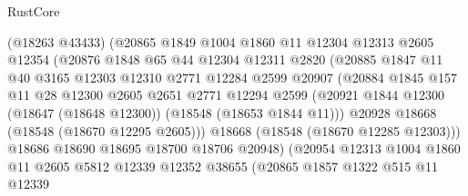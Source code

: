 \begin{lexlean}{RustCore}
\begin{coremodule}
                        (@18263 @43433)
                        (@20865
                          @1849
                          @1004
                          @1860
                          @11
                          @12304
                          @12313
                          @2605
                          @12354
                          (@20876
                            @1848
                            @65
                            @44
                            @12304
                            @12311
                            @2820
                            (@20885
                              @1847
                              @11
                              @40
                              @3165
                              @12303
                              @12310
                              @2771
                              @12284
                              @2599
                              @20907
                              (@20884
                                @1845
                                @157
                                @11
                                @28
                                @12300
                                @2605
                                @2651
                                @2771
                                @12294
                                @2599
                                (@20921
                                  @1844
                                  @12300
                                  (@18647 (@18648 @12300))
                                  (@18548 (@18653 @1844 @11)))
                                @20928
                                @18668
                                (@18548 (@18670 @12295 @2605)))
                              @18668
                              (@18548 (@18670 @12285 @12303)))
                            @18686
                            @18690
                            @18695
                            @18700
                            @18706
                            @20948)
                          (@20954
                            @12313
                            @1004
                            @1860
                            @11
                            @2605
                            @5812
                            @12339
                            @12352
                            @38655
                            (@20865
                              @1857
                              @1322
                              @515
                              @11
                              @12339

\end{coremodule}
\end{lexlean}

